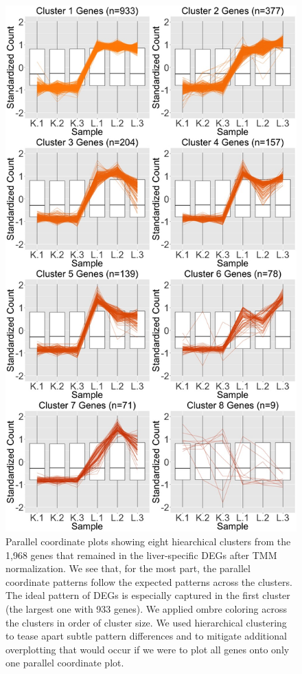\documentclass[11pt,a4paper,oldfontcommands,openany]{memoir}
\numberwithin{equation}{section} %
\begin{document}
\null
\begin{figure}[t!]
\begin{framed}
\centerline{\includegraphics[width=0.65\columnwidth]{MakeFigures/lkClustersOrig.jpg}}
\end{framed}
\caption{Parallel coordinate plots showing eight hiearchical clusters from the 1,968 genes that remained in the liver-specific DEGs after TMM normalization. We see that, for the most part, the parallel coordinate patterns follow the expected patterns across the clusters. The ideal pattern of DEGs is especially captured in the first cluster (the largest one with 933 genes). We applied ombre coloring across the clusters in order of cluster size. We used hierarchical clustering to tease apart subtle pattern differences and to mitigate additional overplotting that would occur if we were to plot all genes onto only one parallel coordinate plot.
\label{lkClustersOrig}}
\end{figure}
\end{document}
